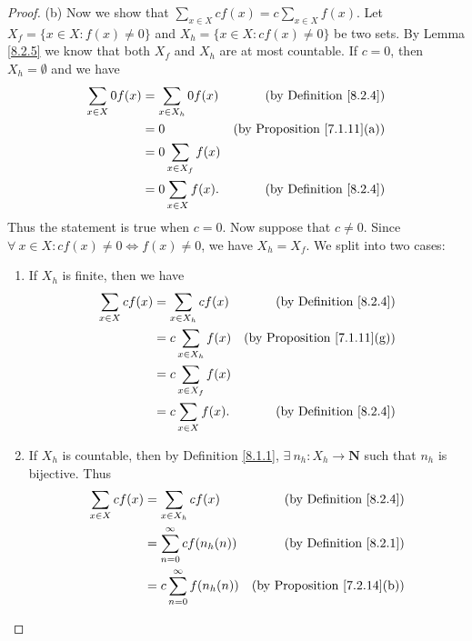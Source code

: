\begin{proof}{(b)}
    Now we show that \(\sum_{x \in X} cf(x) = c \sum_{x \in X} f(x)\).
    Let \(X_f = \{x \in X : f(x) \neq 0\}\) and \(X_h = \{x \in X : cf(x) \neq 0\}\) be two sets.
    By Lemma \ref{8.2.5} we know that both \(X_f\) and \(X_h\) are at most countable.
    If \(c = 0\), then \(X_h = \emptyset\) and we have
    \begin{align*}
        \sum_{x \in X} 0f(x) & = \sum_{x \in X_h} 0f(x)  & \text{(by Definition \ref{8.2.4})}      \\
                             & = 0                       & \text{(by Proposition \ref{7.1.11}(a))} \\
                             & = 0 \sum_{x \in X_f} f(x)                                           \\
                             & = 0 \sum_{x \in X} f(x).  & \text{(by Definition \ref{8.2.4})}
    \end{align*}
    Thus the statement is true when \(c = 0\).
    Now suppose that \(c \neq 0\).
    Since \(\forall\ x \in X : cf(x) \neq 0 \iff f(x) \neq 0\), we have \(X_h = X_f\).
    We split into two cases:
    \begin{enumerate}[label=(\Roman*)]
        \item If \(X_h\) is finite, then we have
              \begin{align*}
                  \sum_{x \in X} cf(x) & = \sum_{x \in X_h} cf(x)  & \text{(by Definition \ref{8.2.4})}      \\
                                       & = c \sum_{x \in X_h} f(x) & \text{(by Proposition \ref{7.1.11}(g))} \\
                                       & = c \sum_{x \in X_f} f(x)                                           \\
                                       & = c \sum_{x \in X} f(x).  & \text{(by Definition \ref{8.2.4})}
              \end{align*}
        \item If \(X_h\) is countable, then by Definition \ref{8.1.1}, \(\exists\ n_h : X_h \to \mathbf{N}\) such that \(n_h\) is bijective.
              Thus
              \begin{align*}
                  \sum_{x \in X} cf(x) & = \sum_{x \in X_h} cf(x)          & \text{(by Definition \ref{8.2.4})}      \\
                                       & = \sum_{n = 0}^\infty cf(n_h(n))  & \text{(by Definition \ref{8.2.1})}      \\
                                       & = c \sum_{n = 0}^\infty f(n_h(n)) & \text{(by Proposition \ref{7.2.14}(b))} \\

\end{align*}
\end{enumerate}
\end{proof}
